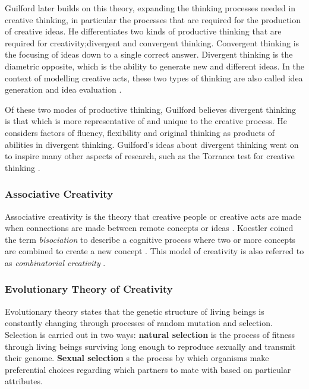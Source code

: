 Guilford later builds on this theory, expanding the thinking processes needed in creative thinking, in particular the processes that are required for the production of creative ideas.
He differentiates two kinds of productive thinking that are required for creativity;divergent and convergent thinking. 
Convergent thinking is the focusing of ideas down to a single correct answer. 
Divergent thinking is the diametric opposite, which is the ability to generate new and different ideas. 
In the context of modelling creative acts, these two types of thinking are also called idea generation and idea evaluation \citep{guilford1957creative}.

Of these two modes of productive thinking, Guilford believes divergent thinking is that which is more representative of and unique to the creative process. 
He considers factors of fluency, flexibility and original thinking as products of abilities in divergent thinking.
Guilford's ideas about divergent thinking went on to inspire many other aspects of research, such as the Torrance test for creative thinking \citep{torrance1966torrance}.

\subsubsection{Associative Creativity}

Associative creativity is the theory that creative people or creative acts are made when connections are made between remote concepts or ideas \citep{mednick1962associative}. 
Koestler coined the term \textit{bisociation} to describe a cognitive process where two or more concepts are combined to create a new concept \citep{koestler1964act}.
This model of creativity is also referred to as \textit{combinatorial creativity} \citep{boden2004creative}.

\subsubsection{Evolutionary Theory of Creativity}

Evolutionary theory states that the genetic structure of living beings is constantly changing through processes of random mutation and selection. Selection is carried out in two ways: \textbf{natural selection} is the process of fitness through living beings surviving long enough to reproduce sexually and transmit their genome. \textbf{Sexual selection} s the process by which organisms make preferential choices regarding which partners to mate with based on particular attributes.

